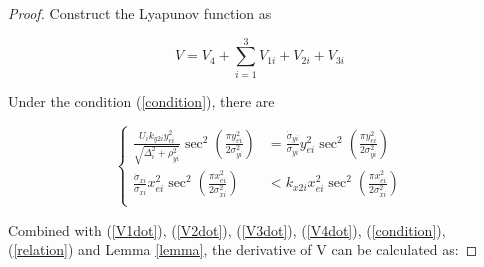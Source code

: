 \documentclass[conference,letterpaper,10.5pt]{IEEEtran}
\begin{document}
\begin{proof} 
	Construct the Lyapunov function as
	
	\begin{equation}\label{V}
		V=V_4+\sum^3_{i=1}V_{1i}+V_{2i}+V_{3i}
	\end{equation}
	
	Under the condition (\ref{condition}), there are 
	
	\begin{equation}\label{relation}
		\left\{
		\begin{aligned}
			\frac{U_ik_{y2i}y^2_{ei}}{\sqrt{\Delta^2_i+\rho^2_{yi}}}\sec^2(\frac{\pi y^2_{ei}}{2\sigma^2_{yi}})&=\frac{\dot{\sigma}_{yi}}{\sigma_{yi}}y^2_{ei}\sec^2(\frac{\pi y_{ei}^2}{2\sigma^2_{yi}})\\
			\frac{\dot{\sigma}_{xi}}{\sigma_{xi}}x^2_{ei}\sec^2(\frac{\pi x_{ei}^2}{2\sigma^2_{xi}})&<k_{x2i}x^2_{ei}\sec^2(\frac{\pi x^2_{ei}}{2\sigma^2_{xi}})\\
		\end{aligned}
		\right.
	\end{equation}
	
	Combined with (\ref{V1dot}), (\ref{V2dot}), (\ref{V3dot}), (\ref{V4dot}), (\ref{condition}), (\ref{relation}) and Lemma \ref{lemma}, the derivative of V can be calculated as:
	

\end{proof}
\end{document}
